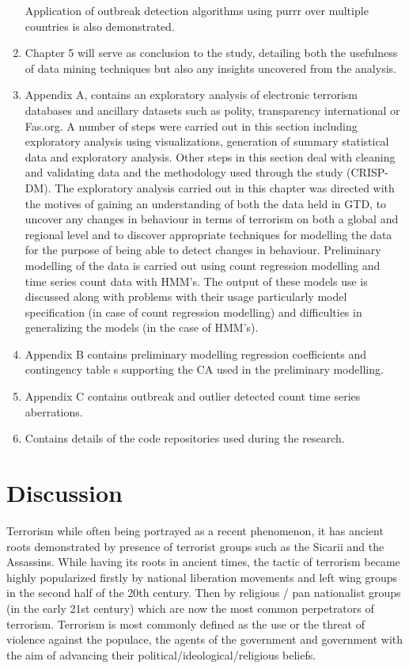 \begin{enumerate}
Application of outbreak detection algorithms using purrr over multiple countries is also demonstrated.
\item Chapter 5 will serve as conclusion to the study, detailing both the usefulness of data mining techniques but also any insights uncovered from the analysis.
\item Appendix A, contains an exploratory analysis of electronic terrorism databases and ancillary datasets such as polity, transparency international or Fas.org. A number of steps were carried out in this section including exploratory analysis using visualizations, generation of summary statistical data and exploratory analysis. Other steps in this section deal with cleaning and validating data and the methodology used through the study (CRISP-DM). The exploratory analysis carried out in this chapter was directed with the motives of gaining an understanding of both the data held in GTD, to uncover any changes in behaviour in terms of terrorism on both a global and regional level and to discover appropriate techniques for modelling the data for the purpose of being able to detect changes in behaviour. Preliminary modelling of the data is carried out using count regression modelling and time series count data with HMM's. The output of these models use is discussed along with problems with their usage particularly model specification (in case of count regression modelling) and difficulties in generalizing the models (in the case of HMM's).
\item Appendix B contains preliminary modelling regression coefficients and contingency table s supporting the CA used in the preliminary modelling.
\item Appendix C contains outbreak and outlier detected count time series aberrations.
\item Contains details of the code repositories used during the research.
\end{enumerate}

\section{Discussion}

Terrorism while often being portrayed as a recent phenomenon, it has ancient roots demonstrated by presence of terrorist groups such as the Sicarii and the Assassins. While having its roots in ancient times, the tactic of terrorism became highly popularized firstly by national liberation movements and left wing groups in the second half of the 20th century. Then by religious / pan nationalist groups (in the early 21st century) which are now the most common perpetrators of terrorism.  Terrorism is most commonly defined as the use or the threat of violence against the populace, the agents of the government and government with the aim of advancing their political/ideological/religious beliefs.

